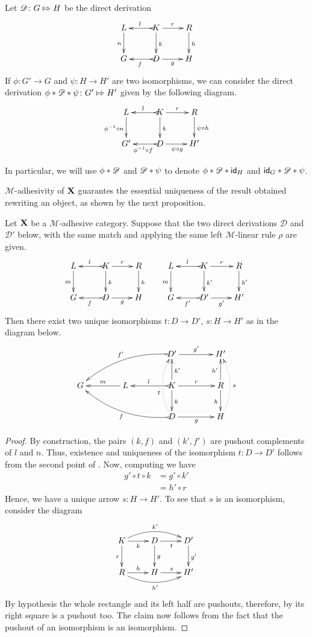 \begin{remark}\label{exa:conc} Let  $\mathscr{D}\colon G\Mapsto H$ be the direct derivation 
	\[\xymatrix{L \ar[d]_{n}& K \ar[d]^{k}\ar@{>->}[l]_{l} \ar[r]^{r} & R \ar[d]^{h}\\G & \ar@{>->}[l]^{f} D \ar[r]_{g}& H}\]
	If $\phi\colon G'\to G$ and $\psi\colon H\to H'$ are two isomorphisms, 	we can consider the direct derivation	$\phi * \mathscr{D}*\psi \colon G'\Mapsto H'$ given by the following diagram.
	\[\xymatrix{L \ar[d]_{\phi^{-1} \circ n}& K \ar[d]^{k}\ar@{>->}[l]_{l} \ar[r]^{r} & R \ar[d]^{\psi \circ h}\\G' & \ar@{>->}[l]^{\phi^{-1} \circ f} D \ar[r]_{\psi \circ g}& H'}\]
	
	In particular, we will use $\phi*\mathscr{D}$ and $\mathscr{D}*\psi$  to denote $\phi*\mathscr{D}*\mathsf{id}_{H}$ and $\mathsf{id}_{G}*\mathscr{D}*\psi$.
\end{remark}



$\mathcal{M}$-adhesivity of $\textbf {\textup{X}}$ guarantes the essential uniqueness of the result obtained rewriting an object, as shown by the next proposition.

\begin{proposition}\label{prop:unique} Let $\textbf {\textup{X}}$  be a $\mathcal{M}$-adhesive category. Suppose that the two direct derivations $\mathscr{D}$ and $\mathscr{D'}$ below, with the same match and applying the same left $\mathcal{M}$-linear rule $\rho$ are given.
	\[\xymatrix{L \ar[d]_{m}& K \ar[d]^{k}\ar@{>->}[l]_{l} \ar[r]^{r} & R \ar[d]^{h} & L \ar[d]_{m}& K \ar[d]^{k'}\ar@{>->}[l]_{l} \ar[r]^{r} & R \ar[d]^{h'}\\G & \ar@{>->}[l]^{f} D \ar[r]_{g}& H & G & \ar@{>->}[l]^{f'} D' \ar[r]_{g'}& H'}\]
	Then there exist two unique isomorphisms $t\colon D\to D'$, $s\colon H\to H'$ as in the diagram below.
	\[\xymatrix@C=40pt{&&D' \ar[r]^{g'} \ar@{>->}@/_.45cm/[dll]_{f'}&H'\\G & L \ar[l]_{m} & K \ar[u]_{k'} \ar[d]^{k}\ar[r]^{r} \ar@{>->}[l]_{l} &R\ar[u]^{h'} \ar[d]_{h}\\&&D\ar@{>->}@/^.45cm/[ull]^{f}\ar@/^.4cm/@{.>}[uu]^(.4){t}|\hole \ar[r]_{g}&H\ar@/_.4cm/@{.>}[uu]_{s}}\]
\end{proposition}
\begin{proof}
	By construction, the pairs $(k, f)$ and $(k', f')$ are pushout complements of $l$ and $n$. Thus, existence and uniqueness of the isomorphism $t\colon D\to D'$ follows from the second point of . Now, computing we have
	\begin{align*}
		g'\circ t \circ k &= g' \circ k'\\&=h'\circ r
	\end{align*}
	Hence, we have a unique arrow $s\colon H\to H'$. To see that $s$ is an isomorphism, consider the diagram 
	\[\xymatrix{K  \ar@/^.4cm/[rr]^{k'}\ar[d]_{r} \ar[r]_{k}& \ar[r]_{t} D \ar[d]^{g}& D' \ar[d]^{g'}\\ R \ar@/_.4cm/[rr]_{h'} \ar[r]^{h}& H \ar[r]^{s}& H'}\]
	By hypothesis the whole rectangle and its left half are pushouts, therefore, by  its right square is a pushout too. The claim now follows from the fact that the pushout of an isomorphism is an isomorphism.
\end{proof}

